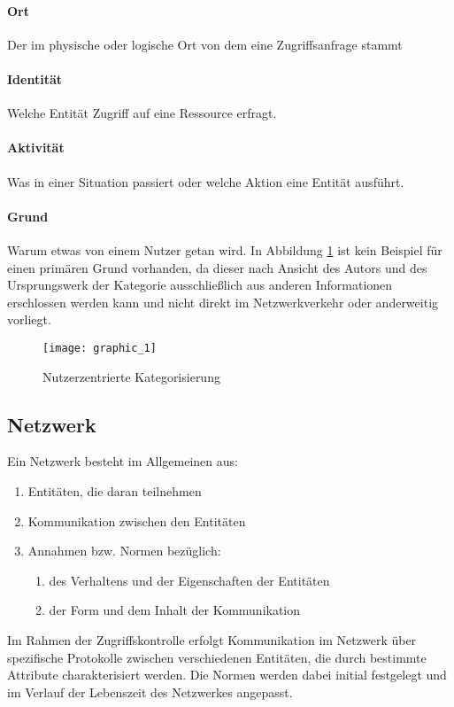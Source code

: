 \paragraph{Ort}
Der im physische oder logische Ort von dem eine Zugriffsanfrage stammt
\paragraph{Identität}
Welche Entität Zugriff auf eine Ressource erfragt.
\paragraph{Aktivität}
Was in einer Situation passiert oder welche Aktion eine Entität ausführt.
\paragraph{Grund}
Warum etwas von einem Nutzer getan wird. In Abbildung \ref{Tax_1} ist kein Beispiel für einen primären Grund vorhanden, da dieser nach Ansicht des Autors und des Ursprungswerk der Kategorie \cite{abowd_towards_1999} ausschließlich aus anderen Informationen erschlossen werden kann und nicht direkt im Netzwerkverkehr oder anderweitig vorliegt.
\begin{figure}[H]
\label{Tax_1}
\centering
\texttt{[image: graphic\_1]}
\caption{Nutzerzentrierte Kategorisierung}
\end{figure}
\subsection{Netzwerk}
Ein Netzwerk besteht im Allgemeinen aus:
\begin{enumerate}
\item{Entitäten, die daran teilnehmen}
\item{Kommunikation zwischen den Entitäten}
\item{Annahmen bzw. Normen bezüglich:}
\begin{enumerate}
	\item{des Verhaltens und der Eigenschaften der Entitäten}
	\item{der Form und dem Inhalt der Kommunikation}
\end{enumerate}
\end{enumerate}
Im Rahmen der Zugriffskontrolle erfolgt Kommunikation im Netzwerk über spezifische Protokolle zwischen verschiedenen Entitäten, die durch bestimmte Attribute charakterisiert werden. Die Normen werden dabei initial festgelegt und im Verlauf der Lebenszeit des Netzwerkes angepasst.

